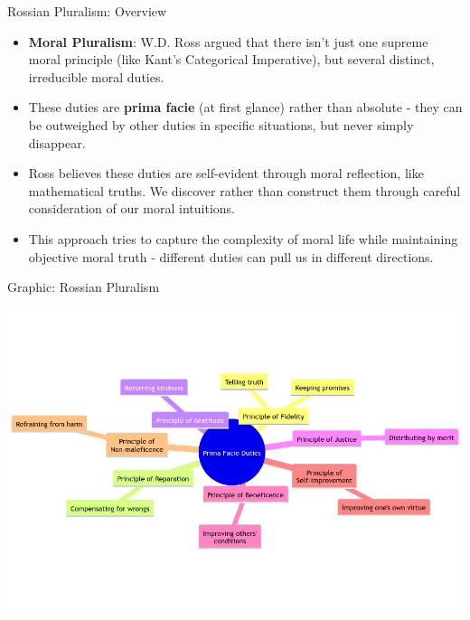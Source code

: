 \documentclass{beamer}
\begin{document}
\begin{frame}{Rossian Pluralism: Overview}
\begin{itemize}
    \item \textbf{Moral Pluralism}: W.D. Ross argued that there isn't just one supreme moral principle (like Kant's Categorical Imperative), but several distinct, irreducible moral duties.
    
    \item These duties are \textbf{prima facie} (at first glance) rather than absolute - they can be outweighed by other duties in specific situations, but never simply disappear.
    
    \item Ross believes these duties are self-evident through moral reflection, like mathematical truths. We discover rather than construct them through careful consideration of our moral intuitions.
    
    \item This approach tries to capture the complexity of moral life while maintaining objective moral truth - different duties can pull us in different directions.
\end{itemize}
\end{frame}

\begin{frame}{Graphic: Rossian Pluralism}
    
    \includegraphics[scale=.35]{ross_pluralism.png}
    
    \end{frame}
\end{document}
